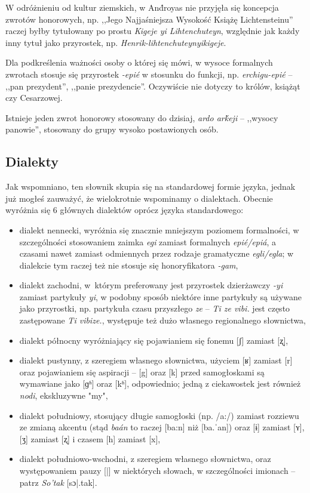 \begin{spacing}{1.1}
W odróżnieniu od kultur ziemskich, w And́royas nie przyjęła się koncepcja
zwrotów honorowych, np. ,,Jego Najjaśniejsza Wysokość Książę Lichtensteinu''
raczej byłby tytułowany po prostu \emph{Kigeje yi Lihtenchuteyn}, względnie jak
każdy inny tytuł jako przyrostek, np. \emph{Henrik-lihtenchuteynyikigeje}.

Dla podkreślenia ważności osoby o której się mówi, w wysoce formalnych zwrotach
stosuje się przyrostek \emph{-epié} w stosunku do funkcji, np.
\emph{erchigu-epié} -- ,,pan prezydent'', ,,panie prezydencie''. Oczywiście nie
dotyczy to królów, książąt czy Cesarzowej.

Istnieje jeden zwrot honorowy stosowany do dzisiaj, \emph{ardo arḱeji} --
,,wysocy panowie'', stosowany do grupy wysoko postawionych osób.

\subsection{Dialekty}
Jak wspomniano, ten słownik skupia się na standardowej formie języka, jednak już
mogłeś zauważyć, że wielokrotnie wspominamy o dialektach. Obecnie wyróżnia się 6
głównych dialektów oprócz języka standardowego:

\begin{itemize}
    \item dialekt nennecki, wyróżnia się znacznie mniejszym poziomem
    formalności, w szczególności stosowaniem zaimka \emph{egi} zamiast
    formalnych \emph{epié/epiá}, a czasami nawet zamiast odmiennych przez
    rodzaje gramatyczne \emph{egli/egla}; w dialekcie tym raczej też nie stosuje
    się honoryfikatora \emph{-gam},
    \item dialekt zachodni, w~którym preferowany jest przyrostek dzierżawczy
    \emph{-yi} zamiast partykuły \emph{yi}, w podobny sposób niektóre inne
    partykuły są używane jako przyrostki, np. partykuła czasu przyszłego
    \emph{ze} -- \emph{Ti ze vibi.} jest często zastępowane \emph{Ti vibize.},
    występuje też dużo własnego regionalnego słownictwa,
    \item dialekt północny wyróżniający się pojawianiem się fonemu [ʃ] zamiast
    [ʐ],
    \item dialekt pustynny, z szeregiem własnego słownictwa, użyciem [ʁ] zamiast
    [r] oraz pojawianiem się aspiracji -- [g] oraz [k] przed samogłoskami są
    wymawiane jako [ɡʱ] oraz [kʱ], odpowiednio; jedną z ciekawostek jest również
    \emph{nodi}, ekskluzywne "my",
    \item dialekt południowy, stosujący długie samogłoski (np. /a:/) zamiast
    rozziewu ze zmianą akcentu (stąd \emph{baán} to raczej [ba:n] niż [ba.ˈan])
    oraz [ɨ] zamiast [ʏ], [ʒ] zamiast [ʐ] i czasem [h] zamiast [x],
    \item dialekt południowo-wschodni, z szeregiem własnego słownictwa, oraz
    występowaniem pauzy [|] w niektórych słowach, w szczególności imionach --
    patrz \emph{So'tak} [sɔ|.tak].
\end{itemize}


\end{spacing}
